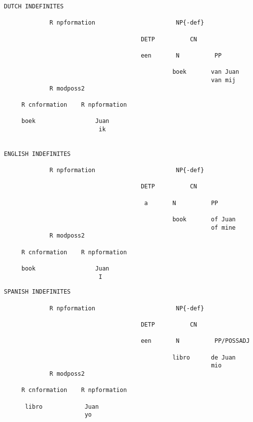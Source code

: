 \begin{verbatim}
DUTCH INDEFINITES

             R npformation                       NP{-def}
                                                 
                                       DETP          CN

                                       een       N          PP

                                                boek       van Juan
                                                           van mij         
             R modposs2

     R cnformation    R npformation

     boek                 Juan                           
                           ik


ENGLISH INDEFINITES

             R npformation                       NP{-def}
                                                 
                                       DETP          CN

                                        a       N          PP

                                                book       of Juan
                                                           of mine
             R modposs2

     R cnformation    R npformation

     book                 Juan                           
                           I
\end{verbatim}
\newpage
\begin{verbatim}
SPANISH INDEFINITES

             R npformation                       NP{-def}
                                                 
                                       DETP          CN

                                       een       N          PP/POSSADJ

                                                libro      de Juan
                                                           mio
             R modposs2

     R cnformation    R npformation

      libro            Juan                           
                       yo                             

\end{verbatim}

